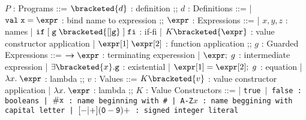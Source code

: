 \documentclass[]{article}
\begin{document}
\begin{center}
    \begin{bnf}
    $P$ : \textsf{Programs} ::=
    $\bracketed{d}$ : definition
    ;;
    $d$ : \textsf{Definitions} ::=
    | $\tt{val} \; x \; \tt{=} \; \expr$ : bind name to expression
    ;;
    $\expr$ : \textsf{Expressions} ::=
    | $x, y, z$ : names
    | $\tt{if} \; \tt{[}\; g \; \bracketed{[] g} \;\tt{]} \; \tt{fi}$ : if-fi 
    | $K \bracketed{\expr}$ : value constructor application 
    | $\expr[1] \; \expr[2]$ : function application 
    ;;
    $g$ : \textsf{Guarded Expressions} ::=  
    $\boldsymbol{\rightarrow}\expr$ : terminating experession
    | $\expr; \; g$ : intermediate expression 
    | $\exists \bracketed{x} \tt{.} g$ : existential 
    | $\expr[1] = \expr[2]; \; g$ : equation 
    | $\lambda x. \; \expr$ : lambda 
    ;;
    $v$ : Values ::= $K\bracketed{v}$ : value constructor application 
    | $\lambda x. \; \expr$ : lambda 
    ;;
    $K$ : \textsf{Value Constructors} ::=
    | \tt{true} $\vert$ \tt{false} : booleans
    | $\tt{\#}x$ : name beginning with \tt{\#}
    | \tt{A-Z}$x$ : name beggining with capital letter
    | $[\tt{-}\vert\tt{+}](\tt{0}-\tt{9})+$ : signed integer literal 
    \end{bnf}
\end{center}

\end{document}
